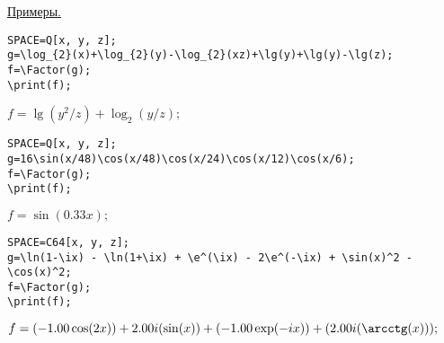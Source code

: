 \smallskip
\underline{Примеры. }

\begin{verbatim}
SPACE=Q[x, y, z]; 
g=\log_{2}(x)+\log_{2}(y)-\log_{2}(xz)+\lg(y)+\lg(y)-\lg(z); 
f=\Factor(g); 
\print(f);
\end{verbatim}

{\hspace*{4mm} $f=\lg(y^2/z)+\log_{2}(y/z);$} 

\begin{verbatim}
SPACE=Q[x, y, z]; 
g=16\sin(x/48)\cos(x/48)\cos(x/24)\cos(x/12)\cos(x/6); 
f=\Factor(g); 
\print(f);
\end{verbatim}\vspace*{-3mm}

{\hspace*{4mm} $f=\sin(0.33x);$} 
 
\begin{verbatim}
SPACE=C64[x, y, z]; 
g=\ln(1-\ix) - \ln(1+\ix) + \e^(\ix) - 2\e^(-\ix) + \sin(x)^2 - \cos(x)^2; 
f=\Factor(g); 
\print(f);
\end{verbatim}\vspace*{-3mm}

{\hspace*{4mm} $f=(-1.00\cos(2x))+2.00i(\sin(x))+(-1.00\exp(-i x))+(2.00i(\arcctg(x)));$} 

